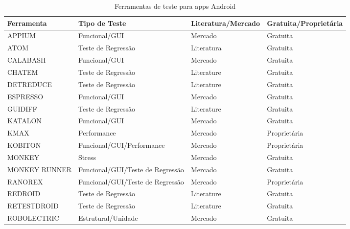 \appendix
{}\label{sec:toolsandroid}


\begin{table}[h!]
\begin{center}
    \scriptsize
    \caption{Ferramentas de teste para apps Android}
    \label{table:androidtools}
    \def \arraystretch{1.2}
    
    \begin{tabular}{m{4cm}m{5cm}m{3cm}m{3cm}}
        \toprule
        \bf Ferramenta & \bf Tipo de Teste & \bf Literatura/Mercado & \bf Gratuita/Proprietária\\ 
        \midrule
        APPIUM \cite{appium} & Funcional/GUI & Mercado & Gratuita & \\\hline
        ATOM \cite{atom} & Teste de Regressão & Literatura & Gratuita\\\hline
        CALABASH \cite{calabash} & Funcional/GUI & Mercado & Gratuita\\\hline
        CHATEM \cite{chatem} & Teste de Regressão & Literature & Gratuita\\\hline
        DETREDUCE \cite{detreduce} & Teste de Regressão & Literature & Gratuita\\\hline
        ESPRESSO \cite{espresso} & Funcional/GUI & Mercado & Gratuita\\\hline
        GUIDIFF \cite{guidiff} & Teste de Regressão & Literature & Gratuita\\\hline
        KATALON \cite{katalon} & Funcional/GUI & Mercado & Gratuita\\\hline
        KMAX \cite{kmax} & Performance & Mercado & Proprietária\\\hline
        KOBITON \cite{kobiton} & Funcional/GUI/Performance & Mercado & Proprietária\\\hline
        MONKEY \cite{monkey} & Stress & Mercado & Gratuita\\\hline
        MONKEY RUNNER \cite{monkeyrunner} & Funcional/GUI/Teste de Regressão & Mercado & Gratuita\\\hline
        RANOREX \cite{ranorex} & Funcional/GUI/Teste de Regressão & Mercado & Proprietária\\\hline
        REDROID \cite{redroid} & Teste de Regressão & Literature & Gratuita\\\hline
        RETESTDROID \cite{retestdroid} & Teste de Regressão & Literature & Gratuita\\\hline
        ROBOLECTRIC \cite{robolectric} & Estrutural/Unidade & Mercado & Gratuita\\\hline

\end{tabular}
\end{center}
\end{table}
